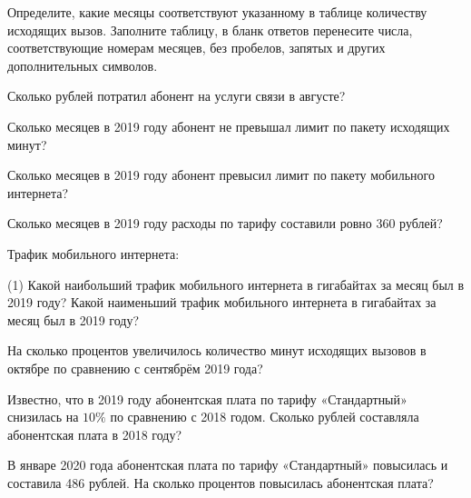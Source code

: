 \begin{exam}
	\begin{listofex}
		\item Определите, какие месяцы соответствуют указанному в таблице количеству исходящих вызов. Заполните таблицу, в бланк ответов перенесите числа, соответствующие номерам месяцев, без пробелов, запятых и других дополнительных символов.
		\begin{figure}[h]
		\end{figure}
		\item Сколько рублей потратил абонент на услуги связи в августе? 
		\item Сколько месяцев в 2019 году абонент не превышал лимит по пакету исходящих минут? 
		\item Сколько месяцев в 2019 году абонент превысил лимит по пакету мобильного интернета?
		\item Сколько месяцев в 2019 году расходы по тарифу составили ровно 360 рублей?
		\item Трафик мобильного интернета:
		\begin{tasks}(1)
			\task[A)] Какой наибольший трафик мобильного интернета в гигабайтах за месяц
			был в 2019 году?
			\task[Б)] Какой наименьший трафик мобильного интернета в гигабайтах за месяц был в 2019 году?
		\end{tasks}
		\item На сколько процентов увеличилось количество минут исходящих вызовов в октябре по сравнению с сентябрём 2019 года?
		\item Известно, что в 2019 году абонентская плата по тарифу «Стандартный» снизилась на \( 10\% \) по сравнению с 2018 годом. Сколько рублей составляла абонентская плата в 2018 году? 
		\item В январе 2020 года абонентская плата по тарифу «Стандартный» повысилась и составила 486 рублей. На сколько процентов повысилась абонентская плата?
	\end{listofex}
\end{exam}
